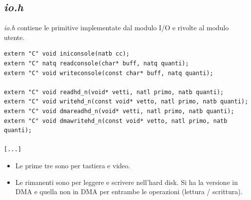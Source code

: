 \documentclass[11pt]{report}
\theoremstyle{definition}
\begin{document}
\subsection{\emph{io.h}}
\emph{io.h} contiene le primitive implementate dal modulo I/O e rivolte al modulo utente.
\small
\begin{verbatim}
extern "C" void iniconsole(natb cc);
extern "C" natq readconsole(char* buff, natq quanti);
extern "C" void writeconsole(const char* buff, natq quanti);

extern "C" void readhd_n(void* vetti, natl primo, natb quanti);
extern "C" void writehd_n(const void* vetto, natl primo, natb quanti);
extern "C" void dmareadhd_n(void* vetti, natl primo, natb quanti);
extern "C" void dmawritehd_n(const void* vetto, natl primo, natb quanti);

[...]
\end{verbatim}
\normalsize
\begin{itemize}
	\item Le prime tre sono per tastiera e video.
	\item Le rimanenti sono per leggere e scrivere nell'hard disk. Si ha la versione in DMA e quella non in DMA per entrambe le operazioni (lettura / scrittura).
\end{itemize}
\end{document}
